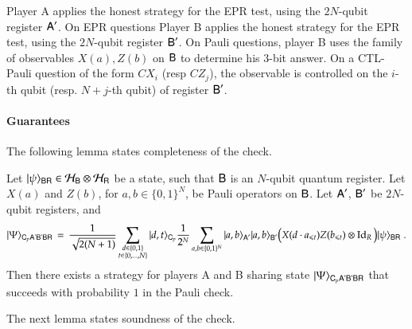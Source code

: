 Player A applies the honest strategy for the EPR test, using the $2N$-qubit register ${\textsf{A}}'$. On EPR questions Player B applies the  honest strategy for the EPR test, using the $2N$-qubit register ${\textsf{B}}'$. On Pauli questions, player B uses the family of observables $X(a),Z(b)$ on ${\textsf{B}}$ to determine his $3$-bit answer. On a CTL-Pauli question of the form $CX_i$ (resp $CZ_j$), the observable is controlled on the $i$-th qubit (resp. $N+j$-th qubit) of register ${\textsf{B}}'$. 

\paragraph{Guarantees}
The following lemma states completeness of the check. 

\begin{lemma}
Let $|\psi\rangle_{{\textsf{BR}}} \in \mathcal H_{\textsf{B}} \otimes \mathcal H_{\textsf{R}}$ be a state, such that ${\textsf{B}}$ is an $N$-qubit quantum register. Let $X(a)$ and $Z(b)$, for $a,b\in\{0,1\}^N$, be Pauli operators on ${\textsf{B}}$. Let ${\textsf{A}}'$, ${\textsf{B}}'$ be $2N$-qubit registers, and 
\begin{equation}\label{eq:honest-psi}\ket{\Psi}_{\reg{C}_{p} \reg{A'B'BR}} \,=\, \frac{1}{\sqrt{2(N+1)}} \sum_{\substack{d\in\{0,1\} \\ t\in\{0,\ldots,N\}}} \ket{d,t}_{\reg{C}_{p}}  \frac{1}{2^N} \sum_{a,b \in \{0,1\}^N} \ket{a,b}_{\reg{A}'} \ket{a,b}_{\reg{B}'} \big(X(d\cdot a_{\leq t}) Z(b_{\leq t})\otimes \Id_R\big)\ket{\psi}_\reg{BR}\;.
\end{equation}
Then there exists a strategy for players A and B sharing state $|\Psi\rangle_{{\textsf{C}}_{p} {\textsf{A'B'BR}}}$ that succeeds with probability $1$ in the Pauli check.  
\end{lemma}

The next lemma states soundness of the check.


